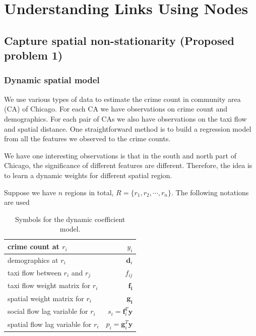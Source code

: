 \chapter{Understanding Links Using Nodes}







\section{Capture spatial non-stationarity (Proposed problem 1)}




\subsection{Dynamic spatial model}


We use various types of data to estimate the crime count in community area (CA) of Chicago. For each CA we have observations on crime count and demographics. For each pair of CAs we also have observations on the taxi flow and spatial distance. One straightforward method is to build a regression model from all the features we observed to the crime counts.

We have one interesting observations is that in the south and north part of Chicago, the significance of different features are different. Therefore, the idea is to learn a dynamic weights for different spatial region.



Suppose we have $n$ regions in total, $R = \{ r_1, r_2, \cdots, r_n \}$.
The following notations are used

\begin{table}[h]
\centering
\begin{tabular}{|l|r|}
\hline
crime count at $r_i$ & $y_i$ \\ \hline
demographics at $r_i$ & $\mathbf{d}_i$ \\ \hline
taxi flow between $r_i$ and $r_j$ & $f_{ij}$ \\ \hline
taxi flow weight matrix for $r_i$ & $\mathbf{f_i}$ \\ \hline
spatial weight matrix for $r_i$ & $\mathbf{g_i}$ \\ \hline
social flow lag variable for $r_i$ & $s_i = \mathbf{f}_i^T \mathbf{y}$ \\\hline
spatial flow lag variable for $r_i$ & $p_i = \mathbf{g}_i^T \mathbf{y}$ \\\hline
\end{tabular}
\caption{Symbols for the dynamic coefficient model.}
\end{table}


